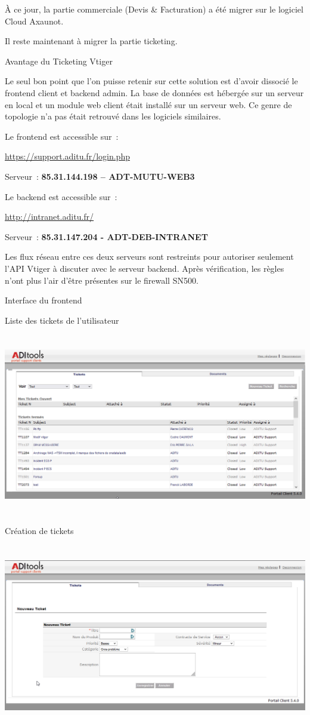 À ce jour, la partie commerciale (Devis \& Facturation) a été migrer sur
le logiciel Cloud Axaunot.

Il reste maintenant à migrer la partie ticketing.

Avantage du Ticketing Vtiger

Le seul bon point que l'on puisse retenir sur cette solution est d'avoir
dissocié le frontend client et backend admin. La base de données est
hébergée sur un serveur en local et un module web client était installé
sur un serveur web. Ce genre de topologie n'a pas était retrouvé dans
les logiciels similaires.

Le frontend est accessible sur~:

\url{https://support.aditu.fr/login.php}

Serveur~: \textbf{85.31.144.198 -- ADT-MUTU-WEB3}

Le backend est accessible sur~:

\url{http://intranet.aditu.fr/}

Serveur~: \textbf{85.31.147.204 - ADT-DEB-INTRANET}

Les flux réseau entre ces deux serveurs sont restreints pour autoriser
seulement l'API Vtiger à discuter avec le serveur backend. Après
vérification, les règles n'ont plus l'air d'être présentes sur le
firewall SN500.

Interface du frontend

Liste des tickets de l'utilisateur

\includegraphics[width=6.3in,height=3.12222in]{image1.png}

Création de tickets

\includegraphics[width=6.3in,height=3.14722in]{image2.png}

